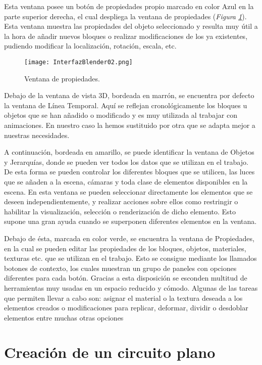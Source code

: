 Esta ventana posee un botón de propiedades propio marcado en color Azul en la parte superior derecha, el cual despliega la ventana de propiedades (\textit{Figura \ref{fig:interfazblender02}}). Esta ventana muestra las propiedades del objeto seleccionado y resulta muy útil a la hora de añadir nuevos bloques o realizar modificaciones de los ya existentes, pudiendo modificar la localización, rotación, escala, etc.

\begin{figure}[h]
	\centering
	\texttt{[image: InterfazBlender02.png]}
	\caption{Ventana de propiedades.} \label{fig:interfazblender02}
\end{figure}

Debajo de la ventana de vista 3D, bordeada en marrón, se encuentra por defecto la ventana de Línea Temporal. Aquí se reflejan cronológicamente los bloques u objetos que se han añadido o modificado y es muy utilizada al trabajar con animaciones. En nuestro caso la hemos sustituido por otra que se adapta mejor a nuestras necesidades.

A continuación, bordeada en amarillo, se puede identificar la ventana de Objetos y Jerarquías, donde se pueden ver todos los datos que se utilizan en el trabajo. De esta forma se pueden controlar los diferentes bloques que se utilicen, las luces que se añaden a la escena, cámaras y toda clase de elementos disponibles en la escena. En esta ventana se pueden seleccionar directamente los elementos que se deseen independientemente, y realizar acciones sobre ellos como restringir o habilitar la visualización, selección o renderización de dicho elemento. Esto supone una gran ayuda cuando se superponen diferentes elementos en la ventana.

Debajo de ésta, marcada en color verde, se encuentra la ventana de Propiedades, en la cual se pueden editar las propiedades de los bloques, objetos, materiales, texturas etc. que se utilizan en el trabajo. Esto se consigue mediante los llamados botones de contexto, los cuales muestran un grupo de paneles con opciones diferentes para cada botón. Gracias a esta disposición se esconden multitud de herramientas muy usadas en un espacio reducido y cómodo. Algunas de las tareas que permiten llevar a cabo son: asignar el material o la textura deseada a los elementos creados o modificaciones para replicar, deformar, dividir o desdoblar elementos entre muchas otras opciones

\section{Creación de un circuito plano}
\label{sec:circarr_circuitoplano}

